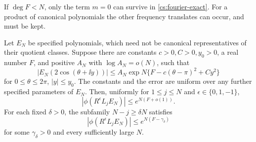 If \(\deg F<N\), only the term \(m=0\) can survive in
\eqref{cs:fourier-exact}. For a product of canonical polynomials the
other frequency translates can occur, and must be kept.

\begin{theorem}\label{cs:root-bound}
Let $E_N$ be specified polynomials, which need not be canonical
representatives of their quotient classes. Suppose
there are constants \(c>0,C>0,y_0>0\), a real number \(F\), and positive
\(A_N\) with \(\log A_N=o(N)\), such that
\begin{equation}\label{cs:strip-hyp}
 |E_N(2\cos(\theta+\ii y))|
 \le A_N\exp N\{F-c(\theta-\pi)^2+Cy^2\}
\end{equation}
for \(0\le\theta\le2\pi\), \(|y|\le y_0\). The constants and the
error are uniform over any further specified parameters of \(E_N\).
Then, uniformly for $1\le j\le N$ and $\epsilon\in\{0,1,-1\}$,
\[
 |\phi(R^\epsilon L_j E_N)|\le e^{N(F+o(1))}.
\]
For each fixed \(\delta>0\), the subfamily \(N-j\ge\delta N\) satisfies
\begin{equation}\label{cs:root-gap}
 |\phi(R^\epsilon L_j E_N)|\le e^{N(F-\gamma_\delta)}
\end{equation}
for some \(\gamma_\delta>0\) and every sufficiently large \(N\).
\end{theorem}

